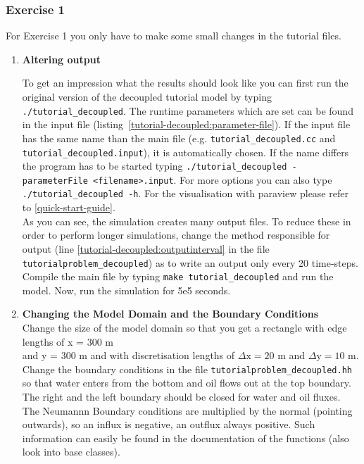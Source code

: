 \subsubsection{Exercise 1}
\renewcommand{\labelenumi}{\alph{enumi})}
For Exercise 1 you only have to make some small changes in the tutorial files.
\begin{enumerate}
\item \textbf{Altering output}

To get an impression what the results should look like you can first run the original version of the decoupled tutorial model by typing  \texttt{./tutorial\_decoupled}. The runtime parameters which are set can be found in the input file (listing~\ref{tutorial-decoupled:parameter-file}). If the input file has the same name than the main file (e.g. \texttt{tutorial\_decoupled.cc} and \texttt{tutorial\_decoupled.input}), it is automatically chosen. If the name differs the program has to be started typing \texttt{./tutorial\_decoupled -parameterFile <filename>.input}. For more options you can also type \texttt{./tutorial\_decoupled -h}. For the visualisation with paraview please refer to \ref{quick-start-guide}.\\
As you can see, the simulation creates many output files. To reduce these in order to perform longer simulations, change the method responsible for output (line \ref{tutorial-decoupled:outputinterval} in the file \texttt{tutorialproblem\_decoupled}) as to write an output only every 20 time-steps. Compile the main file by typing \texttt{make tutorial\_decoupled} and run the model. Now, run the simulation for 5e5 seconds.

\item \textbf{Changing the Model Domain and the Boundary Conditions} \\
Change the size of the model domain so that you get a rectangle
with edge lengths of x = 300 m \\  and y = 300 m and with discretisation lengths of  $\Delta \text{x} = 20$ m and $\Delta \text{y} = 10$ m. \\
Change the boundary conditions in the file \texttt{tutorialproblem\_decoupled.hh} so that water enters from the bottom and oil flows out at the top boundary. The right and the left boundary should be closed for water and oil fluxes. The Neumannn Boundary conditions are multiplied by the normal (pointing outwards), so an influx is negative, an outflux always positive. Such information can easily be found in the documentation of the functions (also look into base classes).


\end{enumerate}
